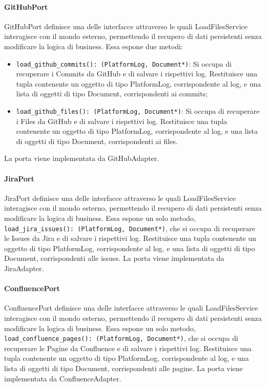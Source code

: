 \paragraph{GitHubPort}
\label{sec:github_port}
GitHubPort definisce una delle interfacce attraverso le quali LoadFilesService interagisce con il mondo esterno, permettendo il recupero di dati persistenti senza modificare la logica di business. Essa espone due metodi:
\begin{itemize}
    \item \texttt{load\_github\_commits(): (PlatformLog, Document*)}: Si occupa di recuperare i Commits da GitHub e di salvare i rispettivi log. Restituisce una tupla contenente un oggetto di tipo PlatformLog, corrispondente al log, e una lista di oggetti di tipo Document, corrispondenti ai commits;
    \item \texttt{load\_github\_files(): (PlatformLog, Document*)}: Si occupa di recuperare i Files da GitHub e di salvare i rispettivi log. Restituisce una tupla contenente un oggetto di tipo PlatformLog, corrispondente al log, e una lista di oggetti di tipo Document, corrispondenti ai files.
\end{itemize}
La porta viene implementata da GitHubAdapter.

\paragraph{JiraPort}
\label{sec:jira_port}
JiraPort definisce una delle interfacce attraverso le quali LoadFilesService interagisce con il mondo esterno, permettendo il recupero di dati persistenti senza modificare la logica di business. Essa espone un solo metodo, \texttt{load\_jira\_issues(): (PlatformLog, Document*)}, che si occupa di recuperare le Issues da Jira e di salvare i rispettivi log. Restituisce una tupla contenente un oggetto di tipo PlatformLog, corrispondente al log, e una lista di oggetti di tipo Document, corrispondenti alle issues. La porta viene implementata da JiraAdapter.

\paragraph{ConfluencePort}
\label{sec:confluence_port}
ConfluencePort definisce una delle interfacce attraverso le quali LoadFilesService interagisce con il mondo esterno, permettendo il recupero di dati persistenti senza modificare la logica di business. Essa espone un solo metodo, \texttt{load\_confluence\_pages(): (PlatformLog, Document*)}, che si occupa di recuperare le Pagine da Confluence e di salvare i rispettivi log. Restituisce una tupla contenente un oggetto di tipo PlatformLog, corrispondente al log, e una lista di oggetti di tipo Document, corrispondenti alle pagine. La porta viene implementata da ConfluenceAdapter.

